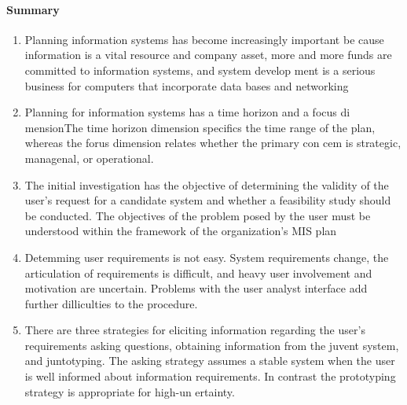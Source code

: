 \documentclass[a4paper,12pt]{report}
\begin{document}
\paragraph{Summary}
\begin{enumerate}
	\item Planning information systems has become increasingly important be cause information is a vital resource and company asset, more and more funds are committed to information systems, and system develop ment is a serious business for computers that incorporate data bases and networking
	\item Planning for information systems has a time horizon and a focus di mensionThe time horizon dimension specifics the time range of the plan, whereas the forus dimension relates whether the primary con cem is strategic, managenal, or operational.
	\item The initial investigation has the objective of determining the validity of the user's request for a candidate system and whether a feasibility study should be conducted. The objectives of the problem posed by the user must be understood within the framework of the organization's MIS plan
	\item Detemming user requirements is not easy. System requirements change, the articulation of requirements is difficult, and heavy user involvement and motivation are uncertain. Problems with the user analyst interface add further dilliculties to the procedure.
	\item There are three strategies for eliciting information regarding the user's requirements asking questions, obtaining information from the juvent system, and juntotyping. The asking strategy assumes a stable system when the user is well informed about information requirements. In contrast the prototyping strategy is appropriate for high-un ertainty.
\end{enumerate}
\end{document}
